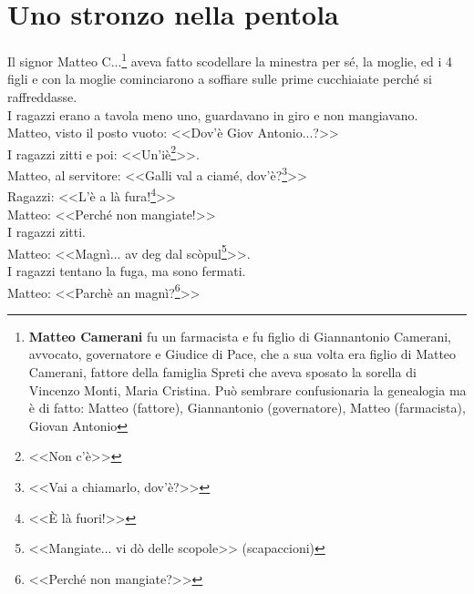 
\chapter{Uno stronzo nella pentola}
Il signor Matteo C.\:.\:.\footnote{\textbf{Matteo Camerani} fu un farmacista e fu figlio di  Giannantonio Camerani, avvocato, governatore e Giudice di Pace, che a sua volta era figlio di Matteo Camerani, fattore della famiglia Spreti che aveva sposato la sorella di Vincenzo Monti, Maria Cristina. Può sembrare confusionaria la genealogia ma è di fatto: Matteo (fattore), Giannantonio (governatore), Matteo (farmacista), Giovan Antonio} aveva fatto scodellare la minestra per sé, la moglie, ed i 4 figli e con la moglie cominciarono a soffiare sulle prime cucchiaiate perché si raffreddasse.\\
\indent I ragazzi erano a tavola meno uno, guardavano in giro e non mangiavano.\\
\indent Matteo, visto il posto vuoto: <<Dov'è Giov Antonio...?>>\\
\indent I ragazzi zitti e poi: <<Un'iè\footnote{<<Non c'è>>}>>.\\
\indent Matteo, al servitore: <<Galli val a ciamé, dov'è?\footnote{<<Vai a chiamarlo, dov'è?>>}>>\\
\indent Ragazzi: <<L'è a là fura!\footnote{<<È là fuori!>>}>>\\
\indent Matteo: <<Perché non mangiate!>>\\
\indent I ragazzi zitti.\\
\indent Matteo:  <<Magnì... av deg dal scòpul\footnote{<<Mangiate... vi dò delle scopole>> (scapaccioni)}>>.\\
\indent I ragazzi tentano la fuga, ma sono fermati.\\
\indent Matteo: <<Parchè an magnì?\footnote{<<Perché non mangiate?>>}>>\\


